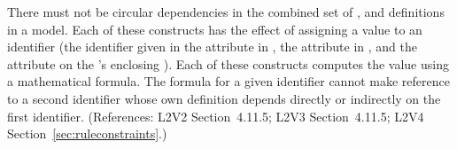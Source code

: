 There must not be circular dependencies in the combined set of
\InitialAssignment, \AssignmentRule and \KineticLaw definitions in a model.
Each of these constructs has the effect of assigning a value to an
identifier (\ie the identifier given in the attribute  in
\InitialAssignment, the attribute  in \AssignmentRule, and the
attribute  on the \KineticLaw's enclosing \Reaction).  Each of these
constructs computes the value using a mathematical formula.  The formula
for a given identifier cannot make reference to a second identifier whose
own definition depends directly or indirectly on the first identifier.
(References: L2V2 Section~4.11.5; L2V3 Section~4.11.5; L2V4 Section~\ref{sec:ruleconstraints}.)
